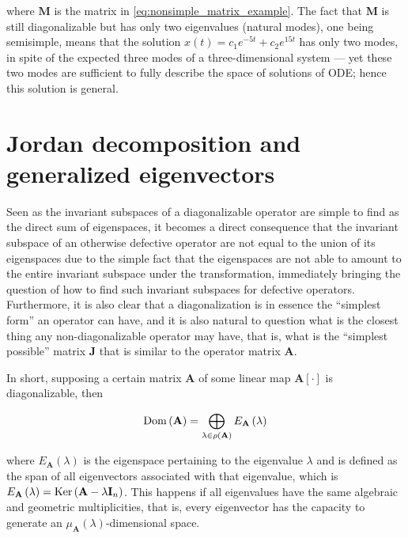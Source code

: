	\noindent where $\mathbf{M}$ is the matrix in \eqref{eq:nonsimple_matrix_example}. The fact that $\mathbf{M}$ is still diagonalizable but has only two eigenvalues (natural modes), one being semisimple, means that the solution $x(t) = c_1e^{-5t} + c_2e^{15t}$ has only two modes, in spite of the expected three modes of a three-dimensional system — yet these two modes are sufficient to fully describe the space of solutions of ODE; hence this solution is general.

\section{Jordan decomposition and generalized eigenvectors}

	Seen as the invariant subspaces of a diagonalizable operator are simple to find as the direct sum of eigenspaces, it becomes a direct consequence that the invariant subspace of an otherwise defective operator are not equal to the union of its eigenspaces due to the simple fact that the eigenspaces are not able to amount to the entire invariant subspace under the transformation, immediately bringing the question of how to find such invariant subspaces for defective operators. Furthermore, it is also clear that a diagonalization is in essence the ``simplest form'' an operator can have, and it is also natural to question what is the closest thing any non-diagonalizable operator may have, that is, what is the ``simplest possible'' matrix $\mathbf{J}$ that is similar to the operator matrix $\mathbf{A}$.

	In short, supposing a certain matrix $\mathbf{A}$ of some linear map $\mathbf{A}\left[\cdot\right]$ is diagonalizable, then

\begin{equation} \operatorname{Dom}\left(\mathbf{A}\right) = \bigoplus_{\lambda\in\rho\left(\mathbf{A}\right)} E_\mathbf{A}\left(\lambda\right)\label{eq:dom_bigosum_eigenspace}\end{equation}

	\noindent where $E_\mathbf{A}\left(\lambda\right)$ is the eigenspace pertaining to the eigenvalue $\lambda$ and is defined as the span of all eigenvectors associated with that eigenvalue, which is $E_\mathbf{A}\left(\lambda\right) = \operatorname{Ker}\left(\mathbf{A} - \lambda\mathbf{I}_n\right)$. This happens if all eigenvalues have the same algebraic and geometric multiplicities, that is, every eigenvector has the capacity to generate an $\mu_\mathbf{A}\left(\lambda\right)$-dimensional space.


